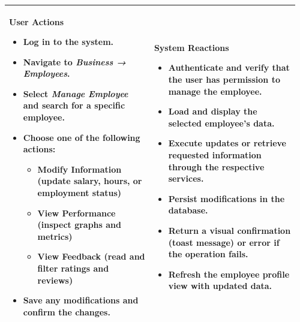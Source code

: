 \documentclass[]{VUMIFTemplateClass}
\newenvironment{mpitemlist}[1][\linewidth]{%
    \begin{minipage}[t]{#1}%
        \setlength{\leftmargini}{12pt}%
        \begin{itemize}%
            \setlength{\itemsep}{1pt}%
            \setlength{\parskip}{0pt}%
            \setlength{\parsep}{0pt}%
}{%
        \end{itemize}%
    \end{minipage}\newline
}
\begin{document}
\begin{center}
\begin{tabular}{|p{0.48\linewidth}|p{0.48\linewidth}|}
\textbf{User Actions} \newline
\begin{mpitemlist}
\item Log in to the system.
\item Navigate to \textit{Business → Employees}.
\item Select \textit{Manage Employee} and search for a specific employee.
\item Choose one of the following actions:
    \begin{itemize}
        \item Modify Information (update salary, hours, or employment status)
        \item View Performance (inspect graphs and metrics)
        \item View Feedback (read and filter ratings and reviews)
    \end{itemize}
\item Save any modifications and confirm the changes.
\end{mpitemlist}
&
\textbf{System Reactions} \newline
\begin{mpitemlist}
\item Authenticate and verify that the user has permission to manage the employee.
\item Load and display the selected employee’s data.
\item Execute updates or retrieve requested information through the respective services.
\item Persist modifications in the database.
\item Return a visual confirmation (toast message) or error if the operation fails.
\item Refresh the employee profile view with updated data.
\end{mpitemlist}
\\ \hline
\end{tabular}
\end{center}
\end{document}
